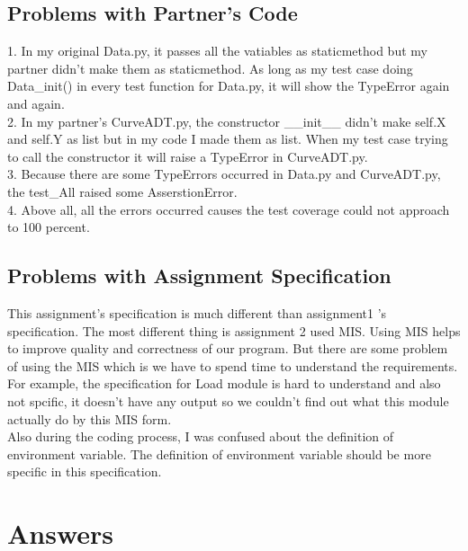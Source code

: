 \documentclass[12pt]{article}
\begin{document}
\subsection{Problems with Partner's Code}
1. In my original Data.py, it passes all the vatiables as staticmethod but my partner didn't make them as staticmethod. As long as my test case doing Data\_init() in every test function for Data.py, it will show the TypeError again and again. \\
2. In my partner's CurveADT.py, the constructor \_\_init\_\_ didn't make self.X and self.Y as list but in my code I made them as list. When my test case trying to call the constructor it will raise a TypeError in CurveADT.py. \\
3. Because there are some TypeErrors occurred in Data.py and CurveADT.py, the test\_All raised some AsserstionError. \\
4. Above all, all the errors occurred causes the test coverage could not approach to 100 percent.
\subsection{Problems with Assignment Specification}
This assignment's specification is much different than assignment1 's specification. The most different thing is assignment 2 used MIS. Using MIS helps to improve quality and correctness of our program. But there are some problem of using the MIS which is we have to spend time to understand the requirements.\\
For example, the specification for Load module is hard to understand and also not spcific, it doesn't have any output so we couldn't find out what this module actually do by this MIS form.\\
Also during the coding process, I was confused about the definition of environment variable. The definition of environment variable should be more specific in this specification. 
\section{Answers}
\end{document}
